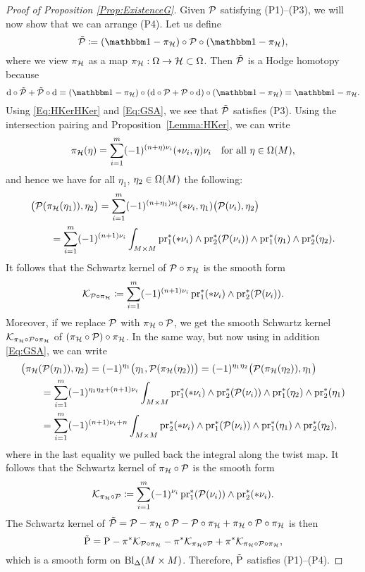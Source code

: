 \documentclass[\MainFolder/Text.tex]{subfiles}
\begin{document}
\begin{proof}[Proof of Proposition \ref{Prop:ExistenceG}]
Given $\mathcal{P}$ satisfying (P1)--(P3), we will now show that we can arrange (P4). Let us define
$$ \tilde{\Htp}\coloneqq (\Id - \pi_{\Harm}) \circ \Htp \circ (\Id - \pi_{\Harm}), $$
where we view $\pi_{\mathcal{H}}$ as a map $\pi_{\mathcal{H}}: \Omega \rightarrow \mathcal{H} \subset \Omega$. Then $\tilde{\mathcal{P}}$ is a Hodge homotopy because
$$ \Dd\circ\tilde{\Htp} + \tilde{\Htp} \circ \Dd = (\Id-\pi_{\Harm})\circ (\Dd\circ \Htp + \Htp \circ \Dd) \circ (\Id-\pi_{\Harm}) = \Id-\pi_{\Harm}. $$
Using \eqref{Eq:HKerHKer} and \eqref{Eq:GSA}, we see that $\tilde{\mathcal{P}}$ satisfies (P3). Using the intersection pairing and Proposition~\ref{Lemma:HKer}, we can write 
$$ \pi_{\mathcal{H}}(\eta) = \sum_{i=1}^m (-1)^{(n+\eta)\nu_i} (* \nu_i, \eta) \nu_i \quad\text{for all }\eta\in\Omega(M),$$
and hence we have for all $\eta_1$, $\eta_2\in \Omega(M)$ the following:
$$ \begin{aligned}
&\bigl(\mathcal{P}(\pi_{\mathcal{H}}(\eta_1)),\eta_2\bigr) = \sum_{i=1}^m (-1)^{(n+\eta_1)\nu_i} (* \nu_i, \eta_1) \bigl(\mathcal{P}(\nu_i), \eta_2\bigr) \\ 
& \qquad = \sum_{i=1}^m (-1)^{(n+1)\nu_i}  \int_{M\times M}\operatorname{\mathrm{pr}}_1^*(* \nu_i)\wedge \operatorname{\mathrm{pr}}_2^*(\mathcal{P}(\nu_i))\wedge \operatorname{\mathrm{pr}}_1^*(\eta_1)\wedge \operatorname{\mathrm{pr}}_2^*(\eta_2).
\end{aligned} $$
It follows that the Schwartz kernel of $\mathcal{P} \circ \pi_{\mathcal{H}}$ is the smooth form
$$ \mathcal{K}_{\mathcal{P}\circ \pi_{\mathcal{H}}} \coloneqq \sum_{i=1}^m (-1)^{(n+1)\nu_i}\operatorname{\mathrm{pr}}_1^*(* \nu_i)\wedge \operatorname{\mathrm{pr}}_2^*(\mathcal{P}(\nu_i)). $$
Moreover, if we replace $\mathcal{P}$ with 
$\pi_{\mathcal{H}}\circ \mathcal{P}$, we get the smooth Schwartz kernel $\mathcal{K}_{\pi_{\mathcal{H}}\circ\mathcal{P}\circ \pi_{\mathcal{H}}}$ of $(\pi_{\mathcal{H}}\circ \mathcal{P}) \circ \pi_{\mathcal{H}}$. In the same way, but now using in addition \eqref{Eq:GSA}, we can write
\allowdisplaybreaks
\begin{align*}
&\bigl(\pi_{\mathcal{H}}(\mathcal{P}(\eta_1)),\eta_2 \bigr) = (-1)^{\eta_1}\bigl( \eta_1, \mathcal{P}(\pi_{\mathcal{H}}(\eta_2))\bigr) = (-1)^{\eta_1 \eta_2} \bigl(\mathcal{P}(\pi_{\mathcal{H}}(\eta_2)),\eta_1\bigr) \\
 &\qquad = \sum_{i=1}^m (-1)^{\eta_1 \eta_2 + (n+1)\nu_i} \int_{M\times M}\operatorname{\mathrm{pr}}_1^*(* \nu_i)\wedge \operatorname{\mathrm{pr}}_2^*(\mathcal{P}(\nu_i))\wedge \operatorname{\mathrm{pr}}_1^*(\eta_2)\wedge \operatorname{\mathrm{pr}}_2^*(\eta_1) \\
 &\qquad = \sum_{i=1}^m (-1)^{(n+1) \nu_i + n} \int_{M \times M} \operatorname{\mathrm{pr}}_2^*(* \nu_i) \wedge \operatorname{\mathrm{pr}}_1^*(\mathcal{P}(\nu_i))\wedge \operatorname{\mathrm{pr}}_1^*(\eta_1)\wedge\operatorname{\mathrm{pr}}_2^*(\eta_2),
\end{align*}
where in the last equality we pulled back the integral along the twist map. It follows that the Schwartz kernel of $\pi_{\mathcal{H}}\circ \mathcal{P}$ is the smooth form
$$ \mathcal{K}_{\pi_{\mathcal{H}}\circ\mathcal{P}} \coloneqq \sum_{i=1}^m (-1)^{\nu_i}\operatorname{\mathrm{pr}}_1^*(\mathcal{P}(\nu_i))\wedge \operatorname{\mathrm{pr}}_2^*(* \nu_i). $$
The Schwartz kernel of $\tilde{\mathcal{P}} = \mathcal{P} - \pi_{\mathcal{H}}\circ \mathcal{P} - \mathcal{P} \circ \pi_{\mathcal{H}} + \pi_{\mathcal{H}}\circ\mathcal{P}\circ\pi_{\mathcal{H}}$ is then
$$ \tilde{\mathrm{P}} = \mathrm{P} - \pi^* \mathcal{K}_{\mathcal{P} \circ \pi_{\mathcal{H}}} - \pi^* \mathcal{K}_{\pi_{\mathcal{H}}\circ\mathcal{P}} + \pi^* \mathcal{K}_{\pi_{\mathcal{H}}\circ\mathcal{P}\circ\pi_{\mathcal{H}}}, $$
which is a smooth form on $\mathrm{Bl}_{\Delta}(M\times M)$. Therefore, $\tilde{\mathrm{P}}$ satisfies (P1)--(P4).


\end{proof}
\end{document}
